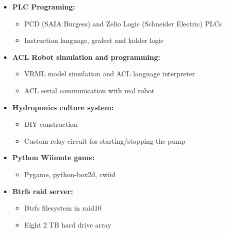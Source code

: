 \documentclass[a4paper,english]{article}
\begin{document}
\begin{itemize}
    \item[] {\bf PLC Programing:}\\ \vspace{-7mm}
    \begin{itemize}
        \setlength{\itemsep}{-1mm}
        \item PCD (SAIA Burgess) and Zelio Logic (Schneider Electric) PLCs
        \item Instruction language, grafcet and ladder logic
    \end{itemize}

    \item[] {\bf ACL Robot simulation and programming:}\\ \vspace{-7mm}
    \begin{itemize}
    \setlength{\itemsep}{-1mm}
        \item VRML model simulation and ACL language interpreter
        \item ACL serial communication with real robot
    \end{itemize}

    \item[] {\bf Hydroponics culture system:}\\ \vspace{-7mm}
    \begin{itemize}
    \setlength{\itemsep}{-1mm}
        \item DIY construction
        \item Custom relay circuit for starting/stopping the pump
    \end{itemize}

    \item[] {\bf Python Wiimote game:}\\ \vspace{-7mm}
    \begin{itemize}
    \setlength{\itemsep}{-1mm}
        \item Pygame, python-box2d, cwiid
    \end{itemize}

    \item[] {\bf Btrfs raid server:}\\ \vspace{-7mm}
    \begin{itemize}
    \setlength{\itemsep}{-1mm}
        \item Btrfs filesystem in raid10
        \item Eight 2 TB hard drive array
    \end{itemize}
\end{itemize}
\end{document}
